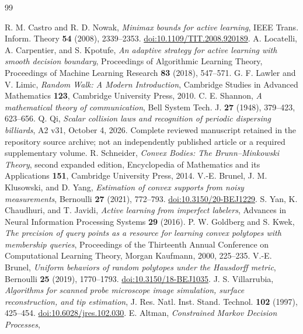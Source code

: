 \begin{thebibliography}{99}
\raggedright
{}
R. M. Castro and R. D. Nowak, \emph{Minimax bounds for active learning},
IEEE Trans. Inform. Theory \textbf{54} (2008), 2339--2353.
\href{https://doi.org/10.1109/TIT.2008.920189}{doi:10.1109/TIT.2008.920189}.
A. Locatelli, A. Carpentier, and S. Kpotufe,
\emph{An adaptive strategy for active learning with smooth decision boundary},
Proceedings of Algorithmic Learning Theory, Proceedings of Machine
Learning Research \textbf{83} (2018), 547--571.
G. F. Lawler and V. Limic, \emph{Random Walk: A Modern Introduction},
Cambridge Studies in Advanced Mathematics \textbf{123}, Cambridge
University Press, 2010.
C. E. Shannon, \emph{A mathematical theory of communication},
Bell System Tech. J. \textbf{27} (1948), 379--423, 623--656.
Q. Qi, \emph{Scalar collision laws and recognition of periodic dispersing
billiards}, A2 v31, October 4, 2026. Complete reviewed manuscript retained in the repository source archive;
not an independently published article or a required supplementary volume.
R. Schneider, \emph{Convex Bodies: The Brunn--Minkowski Theory},
second expanded edition, Encyclopedia of Mathematics and its Applications
\textbf{151}, Cambridge University Press, 2014.
V.-E. Brunel, J. M. Klusowski, and D. Yang,
\emph{Estimation of convex supports from noisy measurements},
Bernoulli \textbf{27} (2021), 772--793.
\href{https://doi.org/10.3150/20-BEJ1229}{doi:10.3150/20-BEJ1229}.
S. Yan, K. Chaudhuri, and T. Javidi,
\emph{Active learning from imperfect labelers},
Advances in Neural Information Processing Systems \textbf{29} (2016).
P. W. Goldberg and S. Kwek,
\emph{The precision of query points as a resource for learning convex
polytopes with membership queries},
Proceedings of the Thirteenth Annual Conference on Computational
Learning Theory, Morgan Kaufmann, 2000, 225--235.
V.-E. Brunel, \emph{Uniform behaviors of random polytopes under the
Hausdorff metric}, Bernoulli \textbf{25} (2019), 1770--1793.
\href{https://doi.org/10.3150/18-BEJ1035}{doi:10.3150/18-BEJ1035}.
J. S. Villarrubia, \emph{Algorithms for scanned probe microscope image
simulation, surface reconstruction, and tip estimation},
J. Res. Natl. Inst. Stand. Technol. \textbf{102} (1997), 425--454.
\href{https://doi.org/10.6028/jres.102.030}{doi:10.6028/jres.102.030}.
E. Altman, \emph{Constrained Markov Decision Processes},

\end{thebibliography}
